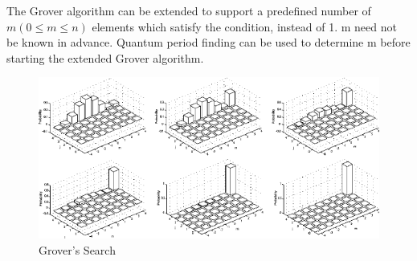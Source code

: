 The Grover algorithm can be extended to support a predefined number of $m (0\leq m\leq n)$ elements which satisfy the condition, instead of 1. m need not be known in advance. Quantum period finding can be used to determine m before starting the extended Grover algorithm.
\begin{figure}[H]
\centering\includegraphics[width=1\textwidth]{images/grover.png}
\caption{Grover's Search}
\end{figure}

